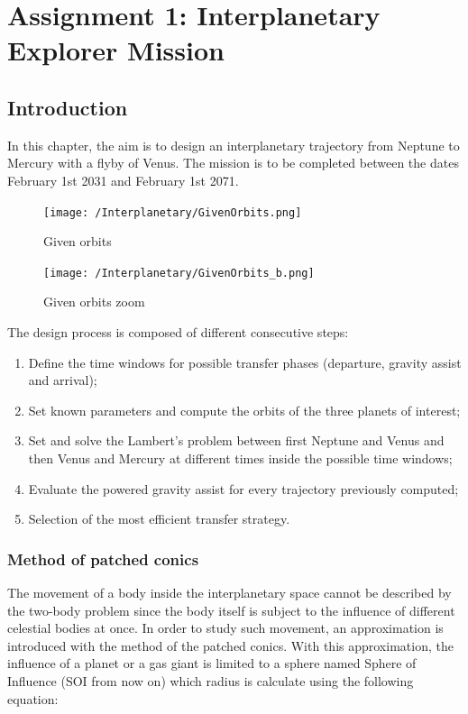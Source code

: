 \documentclass[11pt,a4paper]{report}
\begin{document}
\printnomenclature
\tableofcontents

\chapter{Assignment 1: Interplanetary Explorer Mission}

\section{Introduction}
In this chapter, the aim is to design an interplanetary trajectory from Neptune to Mercury with a flyby of Venus. The mission is to be completed between the dates February 1st 2031 and February 1st 2071.\\

\begin{figure}[H]
\centering
\texttt{[image: /Interplanetary/GivenOrbits.png]}
\caption{Given orbits}
\end{figure}

\begin{figure}[H]
\centering
\texttt{[image: /Interplanetary/GivenOrbits\_b.png]}
\caption{Given orbits zoom}
\end{figure}

The design process is composed of  different consecutive steps:\\
\begin{enumerate}
\item Define the time windows for possible transfer phases (departure, gravity assist and arrival);
\item Set known parameters and compute the orbits of the three planets of interest;
\item Set and solve the Lambert’s problem between first Neptune and Venus and then Venus and Mercury at different times inside the possible time windows;
\item Evaluate the powered gravity assist for every trajectory previously computed;
\item Selection of the most efficient transfer strategy.
\end{enumerate}

\subsection{Method of patched conics}
The movement of a body inside the interplanetary space cannot be described by the two-body problem since the body itself is subject to the influence of different celestial bodies at once.
In order to study such movement, an approximation is introduced with the method of the patched conics. With this approximation, the influence of a planet or a gas giant is limited to a sphere named Sphere of Influence (SOI from now on) which radius is calculate using the following equation:
\end{document}
